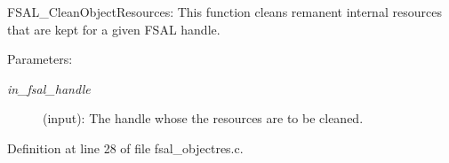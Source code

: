 FSAL\_\-Clean\-Object\-Resources: This function cleans remanent internal resources that are kept for a given FSAL handle.

\begin{Desc}
\item[Parameters:]
\begin{description}
\item[{\em in\_\-fsal\_\-handle}](input): The handle whose the resources are to be cleaned. \end{description}
\end{Desc}


Definition at line 28 of file fsal\_\-objectres.c.